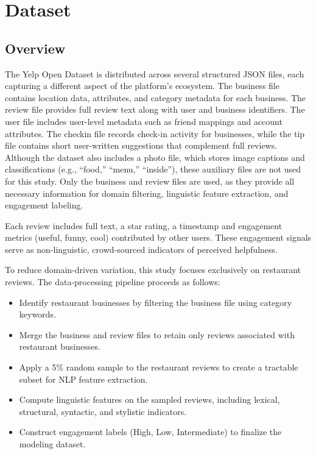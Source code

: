 \documentclass[12pt]{article}
\begin{document}
\section{Dataset}

\subsection{Overview}

The Yelp Open Dataset is distributed across several structured JSON files, each capturing a different aspect of the platform's ecosystem. The business file contains location data, attributes, and category metadata for each business. The review file provides full review text along with user and business identifiers. The user file includes user-level metadata such as friend mappings and account attributes. The checkin file records check-in activity for businesses, while the tip file contains short user-written suggestions that complement full reviews. Although the dataset also includes a photo file, which stores image captions and classifications (e.g., “food,” “menu,” “inside”), these auxiliary files are not used for this study. Only the business and review files are used, as they provide all necessary information for domain filtering, linguistic feature extraction, and engagement labeling.

Each review includes full text, a star rating, a timestamp and engagement metrics (useful, funny, cool) contributed by other users. These engagement signals serve as non-linguistic, crowd-sourced indicators of perceived helpfulness.

To reduce domain-driven variation, this study focuses exclusively on restaurant reviews. The data-processing pipeline proceeds as follows:

\begin{itemize}
\item Identify restaurant businesses by filtering the business file using category keywords.
\item Merge the business and review files to retain only reviews associated with restaurant businesses.
\item Apply a 5\% random sample to the restaurant reviews to create a tractable subset for NLP feature extraction.
\item Compute linguistic features on the sampled reviews, including lexical, structural, syntactic, and stylistic indicators.
\item Construct engagement labels (High, Low, Intermediate) to finalize the modeling dataset.
\end{itemize}
\end{document}
